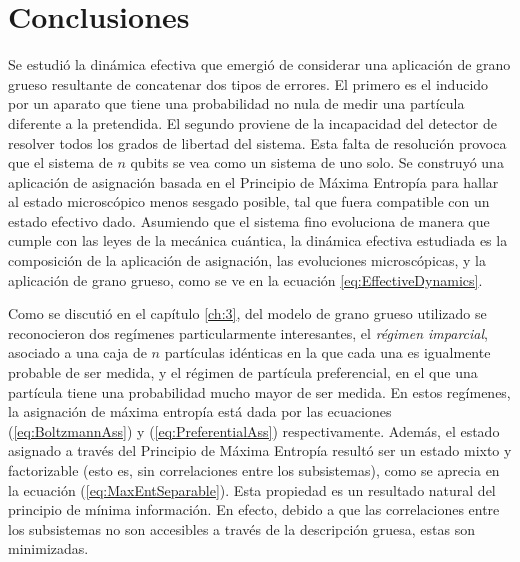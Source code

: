 \chapter{Conclusiones}\label{sec:conclusions}



 

Se estudió la dinámica efectiva que emergió de considerar una aplicación de grano grueso resultante de concatenar dos tipos de errores. El primero es el inducido por un aparato que tiene una probabilidad no nula de medir una partícula diferente a la pretendida. El segundo proviene de la incapacidad del detector de resolver todos los grados de libertad del sistema. Esta falta de resolución provoca que el sistema de $n$ qubits se vea como un sistema de uno solo. Se construyó una aplicación de asignación basada en el Principio de Máxima Entropía para hallar al estado microscópico menos sesgado posible, tal que fuera compatible con un estado efectivo dado. Asumiendo que el sistema fino evoluciona de manera que cumple con las leyes de la mecánica cuántica, la dinámica efectiva estudiada es la composición de la aplicación de asignación, las evoluciones microscópicas, y la aplicación de grano grueso, como se ve en la ecuación \ref{eq:EffectiveDynamics}.


Como se discutió en el capítulo \ref{ch:3}, del modelo de grano grueso utilizado se reconocieron dos regímenes particularmente interesantes, el \textit{régimen imparcial}\acnote{\checkmark}, asociado a una caja de $n$ partículas idénticas en la que cada una es igualmente probable de ser medida, y el régimen de partícula preferencial, en el que una partícula tiene una probabilidad mucho mayor de ser medida. En estos regímenes, la asignación de máxima entropía está dada por las ecuaciones (\ref{eq:BoltzmannAss}) y (\ref{eq:PreferentialAss}) respectivamente.  Además, el estado asignado a través del Principio de Máxima Entropía resultó ser un estado mixto y factorizable (esto es, sin correlaciones entre los subsistemas), como se aprecia en la ecuación (\ref{eq:MaxEntSeparable}). Esta propiedad es un resultado natural del principio de mínima información. En efecto, debido a que las correlaciones entre los subsistemas no son accesibles a través de la descripción gruesa, estas son minimizadas.

